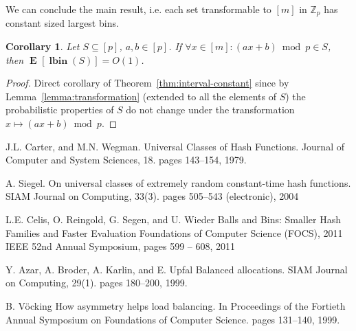 \documentclass{article}
\newcommand{\vlbin}[1]{\operatorname{\mathbf{lbin}}({#1})}
\newcommand{\expects}[2]{\operatorname{\mathbf{E}}_{{#1}}\left[{#2}\right]}
\newcommand{\expect}[1]{\expects{}{#1}}
\newtheorem{corollary}{Corollary}
\begin{document}
We can conclude the main result, i.e. each set transformable to $[m]$ in $\mathbb{Z}_p$ has constant sized largest bins.
\begin{corollary}
Let $S \subseteq [p]$, $a, b \in [p]$. 
If $\forall x \in [m] \colon (ax + b) \bmod p \in S$, then $\expect{\vlbin{S}} = O(1)$.
\end{corollary}
\begin{proof}
Direct corollary of Theorem~\ref{thm:interval-constant} since by Lemma~\ref{lemma:transformation} (extended to all the elements of $S$) the probabilistic properties of $S$ do not change under the transformation $x \mapsto (ax + b) \bmod p$.
\end{proof}


\begin{thebibliography}{32}
J.L. Carter, and M.N. Wegman. 
\newblock Universal Classes of Hash Functions.
\newblock Journal of Computer and System Sciences, 18. pages 143--154, 1979.

A. Siegel. 
\newblock On universal classes of extremely random constant-time hash functions.
\newblock SIAM Journal on Computing, 33(3). pages 505--543 (electronic), 2004

L.E. Celis, O. Reingold, G. Segen, and U. Wieder
\newblock Balls and Bins: Smaller Hash Families and Faster Evaluation
\newblock Foundations of Computer Science (FOCS), 2011 IEEE 52nd Annual Symposium, pages 599 -- 608, 2011

Y. Azar, A. Broder, A. Karlin, and E. Upfal
\newblock Balanced allocations.
\newblock SIAM Journal on Computing, 29(1). pages 180--200, 1999.

B. V\"{o}cking
\newblock How asymmetry helps load balancing.
\newblock In Proceedings of the Fortieth Annual Symposium on Foundations of Computer Science. pages 131--140, 1999.
\end{thebibliography}
\end{document}
